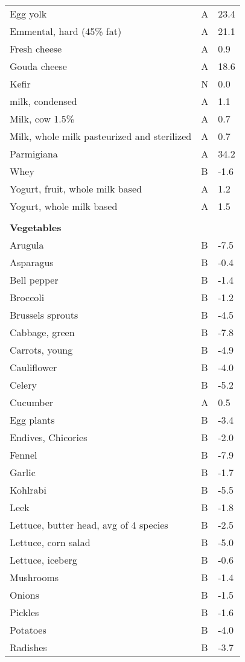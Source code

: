 \documentclass[../main.tex]{subfiles}
\begin{document}
\begin{longtable}{p{7cm}p{0.5cm}p{1cm}}
Egg yolk  & A  & 23.4 \\
Emmental, hard (45\% fat)  & A  & 21.1 \\
Fresh cheese  & A  & 0.9 \\
Gouda cheese  & A  & 18.6 \\
Kefir  & N  & 0.0 \\
milk, condensed  & A  & 1.1 \\
Milk, cow 1.5\%  & A  & 0.7 \\
Milk, whole milk pasteurized and sterilized  & A  & 0.7 \\
Parmigiana  & A  & 34.2 \\
Whey  & B  & -1.6 \\
Yogurt, fruit, whole milk based  & A  & 1.2 \\
Yogurt, whole milk based  & A  & 1.5 \\
 \\
\multicolumn{3}{l}{\textbf{Vegetables}}  \\
Arugula  & B  & -7.5 \\
Asparagus  & B  & -0.4 \\
Bell pepper  & B  & -1.4 \\
Broccoli  & B  & -1.2 \\
Brussels sprouts  & B  & -4.5 \\
Cabbage, green  & B  & -7.8 \\
Carrots, young  & B  & -4.9 \\
Cauliflower  & B  & -4.0 \\
Celery  & B  & -5.2 \\
Cucumber  & A  & 0.5 \\
Egg plants  & B  & -3.4 \\
Endives, Chicories  & B  & -2.0 \\
Fennel  & B  & -7.9 \\
Garlic   & B  & -1.7 \\
Kohlrabi  & B  & -5.5 \\
Leek  & B  & -1.8 \\
Lettuce, butter head, avg of 4 species  & B  & -2.5 \\
Lettuce, corn salad   & B  & -5.0 \\
Lettuce, iceberg  & B  & -0.6 \\
Mushrooms  & B  & -1.4 \\
Onions  & B  & -1.5 \\
Pickles  & B  & -1.6 \\
Potatoes  & B  & -4.0 \\
Radishes  & B  & -3.7 \\

\end{longtable}
\end{document}
